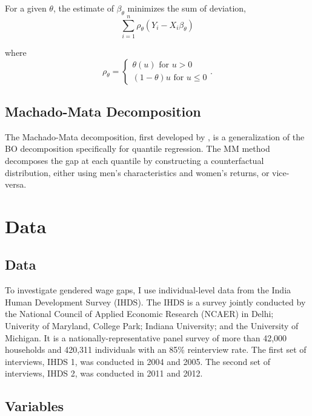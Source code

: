 \documentclass[12pt]{article}
\begin{document}
For a given $\theta$, the estimate of $\beta_{\theta}$ minimizes the sum of deviation,
\begin{equation}
	\sum_{i=1}^{n} \rho_{\theta} \left( Y_{i} - X_{i} \beta_{\theta} \right) 
\end{equation}

where
\begin{equation}
	\rho_{\theta} = \begin{cases}
		\theta\left(u \right)  \text{ for } u > 0 \\
		\left( 1-\theta \right) u \text{ for } u \leq 0
	\end{cases}
.\end{equation}


\subsection{Machado-Mata Decomposition
\label{subsec:m-m-decomposition}}

The Machado-Mata decomposition, first developed by \citet{MachadoMata2005}, is a generalization of the BO decomposition specifically for quantile regression. The MM method decomposes the gap at each quantile by constructing a counterfactual distribution, either using men's characteristics and women's returns, or vice-versa.

\section{Data
\label{sec:data}}

\subsection{Data}
To investigate gendered wage gaps, I use individual-level data from the India Human Development Survey (IHDS). The IHDS is a survey jointly conducted by the National Council of Applied Economic Research (NCAER) in Delhi; Univerity of Maryland, College Park; Indiana University; and the University of Michigan. It is a nationally-representative panel survey of more than 42,000 households and 420,311 individuals with an 85\% reinterview rate. The first set of interviews, IHDS 1, was conducted in 2004 and 2005. The second set of interviews, IHDS 2, was conducted in 2011 and 2012.


\subsection{Variables}
\end{document}
